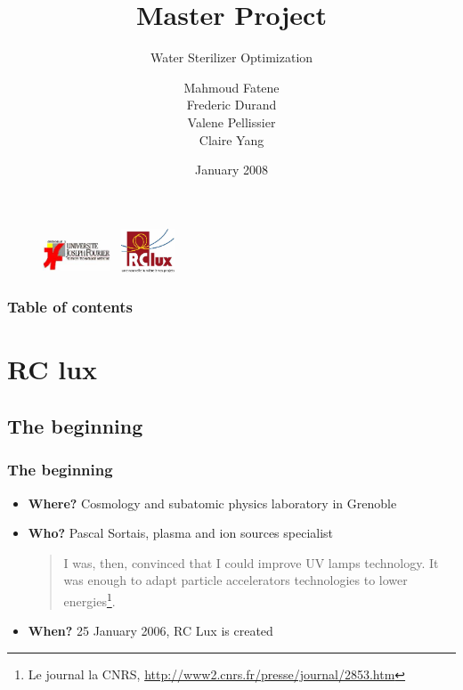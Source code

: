 \documentclass[xcolor=dvipsnames,10pt]{beamer}
\author{Mahmoud Fatene \\ Frederic Durand \\ Valene Pellissier \\ Claire Yang}
\title[Master Project]{Master Project}
\subtitle{Water Sterilizer Optimization}
\date{January 2008}
\begin{document}
  \begin{frame}
          \titlepage
          \begin{figure}
          \raggedleft
          \includegraphics[height=1cm, width=2cm]{./images/logoUJF.jpg}
          \hspace{65mm}
          \raggedright
          \includegraphics[height=1.3cm, width=2cm]{./images/logoRCLux.jpg}
          \end{figure}
  \end{frame}

  \begin{frame}
          \frametitle{Table of contents}
          \tableofcontents
  \end{frame}


  \section{RC lux}

  \subsection{The beginning}

  \begin{frame}
          \frametitle{The beginning}
  \begin{itemize}[<+->]
  \item \textbf{Where? } Cosmology and subatomic physics laboratory in Grenoble
  \item \textbf{Who? } Pascal Sortais, plasma and ion sources specialist
	\begin{quotation}
	 I was, then, convinced that I could improve UV lamps technology. It was enough to adapt particle accelerators technologies to lower energies\footnote{Le journal la CNRS, \url{http://www2.cnrs.fr/presse/journal/2853.htm}}.
	\end{quotation} 
  \item \textbf{When? } 25 January 2006, RC Lux is created
	\end{itemize}
  \end{frame}
\end{document}
